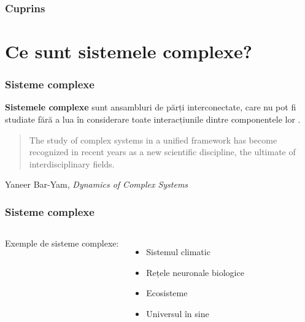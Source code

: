 \frame{\titlepage}

\begin{frame}
\frametitle{Cuprins}

\tableofcontents
\end{frame}

\section{Ce sunt sistemele complexe?}

\begin{frame}
\frametitle{Sisteme complexe}

\textbf{Sistemele complexe} sunt ansambluri de părți interconectate, care nu pot fi studiate fără a lua în considerare toate interacțiunile dintre componentele lor \autocite{Estrada2023}. \\[1em]

\begin{quote}
    The study of complex systems in a unified framework has become recognized in recent years as a new scientific discipline, the ultimate of interdisciplinary fields.
\end{quote}
\hspace*{\fill} Yaneer Bar-Yam, \emph{Dynamics of Complex Systems} \autocite{Bar-Yam2019}
\end{frame}

\begin{frame}
\frametitle{Sisteme complexe}

\begin{columns}
        Exemple de sisteme complexe:
        \begin{itemize}
            \item Sistemul climatic
            \item Rețele neuronale biologice
            \item Ecosisteme
            \item Universul în sine
        \end{itemize}

\end{columns}
\end{frame}

